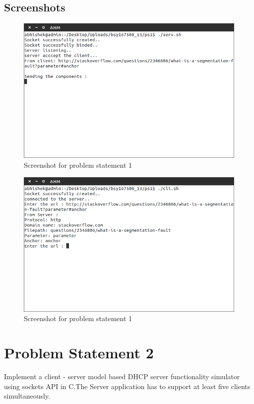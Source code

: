 \documentclass[11pt]{report}
\begin{document}
\subsection{Screenshots}
	\begin{figure}[h!]
	\centering
	\includegraphics[scale=0.8, center]{images/screenshot11}
	\caption{Screenshot for problem statement 1}
	\end{figure}
	\begin{figure}[h!]
	\centering
	\includegraphics[scale=0.8, center]{images/screenshot12}
	\caption{Screenshot for problem statement 1}
	\end{figure}
	\pagebreak
\section{Problem Statement 2}
Implement a client - server model based DHCP server functionality simulator using sockets API in C.The Server application has to support at least five clients simultaneously.\\
\end{document}
